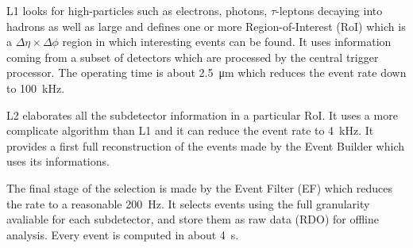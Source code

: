 L1 looks for high-\pt particles such as electrons, photons, $\tau$-leptons decaying into hadrons as well as large \met and defines one or more Region-of-Interest (RoI) which is a $\Delta \eta \times \Delta \phi$ region in which interesting events can be found. It uses information coming from a subset of detectors which are processed by the central trigger processor. The operating time is about \SI{2.5}{\um} which reduces the event rate down to \SI{100}{\kHz}.

L2 elaborates all the subdetector information in a particular RoI. It uses a more complicate algorithm than L1 and it can reduce the event rate to \SI{4}{\kHz}. It provides a first full reconstruction of the events made by the Event Builder which uses its informations.

The final stage of the selection is made by the Event Filter (EF) which reduces the rate to a reasonable \SI{200}{\Hz}. It selects events using the full granularity avaliable for each subdetector, and store them as raw data (RDO) for offline analysis. Every event is computed in about \SI{4}{\s}.




